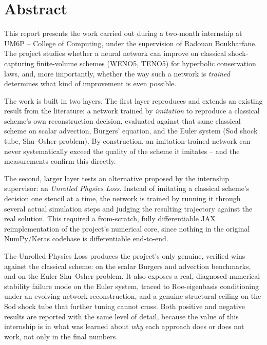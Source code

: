 \documentclass[11pt]{article}
\begin{document}
\tableofcontents
\thispagestyle{plain}
\newpage

\section{Abstract}

This report presents the work carried out during a two-month internship at
UM6P -- College of Computing, under the supervision of Radouan Boukharfane.
The project studies whether a neural network can improve on classical
shock-capturing finite-volume schemes (WENO5, TENO5) for hyperbolic
conservation laws, and, more importantly, whether the way such a network is
\emph{trained} determines what kind of improvement is even possible.

The work is built in two layers. The first layer reproduces and extends an
existing result from the literature: a network trained by \emph{imitation}
to reproduce a classical scheme's own reconstruction decision, evaluated
against that same classical scheme on scalar advection, Burgers' equation,
and the Euler system (Sod shock tube, Shu--Osher problem). By construction,
an imitation-trained network can never systematically exceed the quality of
the scheme it imitates -- and the measurements confirm this directly.

The second, larger layer tests an alternative proposed by the internship
supervisor: an \emph{Unrolled Physics Loss}. Instead of imitating a
classical scheme's decision one stencil at a time, the network is trained
by running it through several actual simulation steps and judging the
resulting trajectory against the real solution. This required a
from-scratch, fully differentiable JAX reimplementation of the project's
numerical core, since nothing in the original NumPy/Keras codebase is
differentiable end-to-end.

The Unrolled Physics Loss produces the project's only genuine, verified
wins against the classical scheme: on the scalar Burgers and advection
benchmarks, and on the Euler Shu--Osher problem. It also exposes a real,
diagnosed numerical-stability failure mode on the Euler system, traced to
Roe-eigenbasis conditioning under an evolving network reconstruction, and a
genuine structural ceiling on the Sod shock tube that further tuning cannot
cross. Both positive and negative results are reported with the same level
of detail, because the value of this internship is in what was learned
about \emph{why} each approach does or does not work, not only in the
final numbers.
\end{document}
